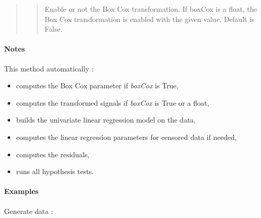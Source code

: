 \documentclass[letterpaper,10pt,english]{sphinxmanual}
\begin{document}
\begin{fulllineitems}
\begin{quote}
\begin{description}
\begin{quote}
Enable or not the Box Cox transformation. If boxCox is a float, the Box
Cox transformation is enabled with the given value. Default is False.
\end{quote}

\end{description}\end{quote}
\paragraph{Notes}

This method automatically :
\begin{itemize}
\item {} 
computes the Box Cox parameter if \emph{boxCox} is True,

\item {} 
computes the transformed signals if \emph{boxCox} is True or a float,

\item {} 
builds the univariate linear regression model on the data,

\item {} 
computes the linear regression parameters for censored data if needed,

\item {} 
computes the residuals,

\item {} 
runs all hypothesis tests.

\end{itemize}
\paragraph{Examples}

Generate data :


\end{fulllineitems}
\end{document}
